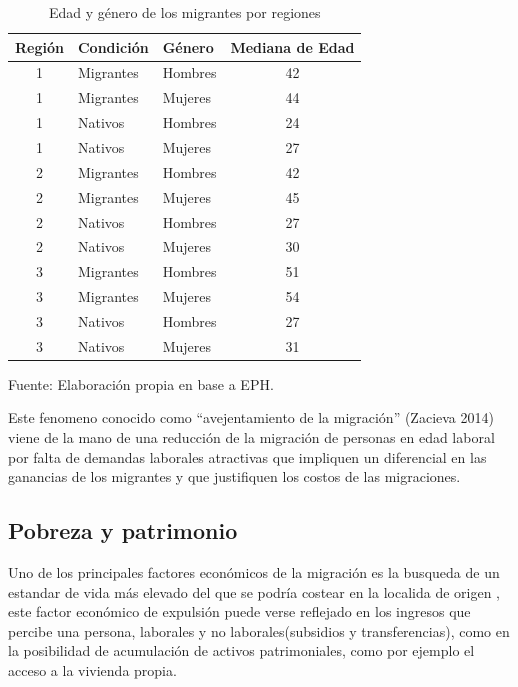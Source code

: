 \documentclass[12pt,a4paper]{article}
\begin{document}
\begin{table}[ht!]
\caption{Edad y género de los migrantes por regiones} 
\centering
\footnotesize
\begin{tabular}{cllc}
  \hline
Región & Condición & Género & Mediana de Edad \\ 
  \hline
  1 & Migrantes & Hombres & 42 \\ 
  1 & Migrantes & Mujeres & 44 \\ 
  1 & Nativos & Hombres & 24 \\ 
  1 & Nativos & Mujeres & 27 \\ 
  2 & Migrantes & Hombres & 42 \\ 
  2 & Migrantes & Mujeres & 45 \\ 
  2 & Nativos & Hombres & 27 \\ 
  2 & Nativos & Mujeres & 30 \\ 
  3 & Migrantes & Hombres & 51 \\ 
  3 & Migrantes & Mujeres & 54 \\ 
  3 & Nativos & Hombres & 27 \\ 
  3 & Nativos & Mujeres & 31 \\ 
   \hline
\end{tabular}
\label{cuadro:edad_mig}
\begin{flushleft}
\begin{scriptsize}
Fuente: Elaboración propia en base a EPH.
\end{scriptsize}
\end{flushleft}
\end{table}

Este fenomeno conocido como ``avejentamiento de la migración'' (Zacieva 2014) viene de la mano de una reducción de la migración de personas en edad laboral por falta de demandas laborales atractivas que impliquen un diferencial en las ganancias de los migrantes y que justifiquen los costos de las migraciones.

\subsection{Pobreza y patrimonio}
Uno de los principales factores económicos de la migración es la busqueda de un estandar de vida más elevado del que se podría costear en la localida de origen \parencite{simpson_demographic_2017}, este factor económico de expulsión  puede verse reflejado en los ingresos que percibe una persona, laborales y no laborales(subsidios y transferencias), como en la posibilidad de acumulación de activos patrimoniales, como por ejemplo el acceso a la vivienda propia. 
\end{document}
